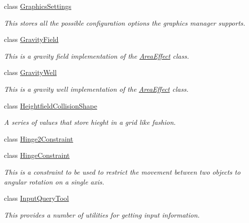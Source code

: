 \begin{DoxyCompactItemize}
class \hyperlink{structMezzanine_1_1GraphicsSettings}{GraphicsSettings}
\begin{DoxyCompactList}\small\item\em This stores all the possible configuration options the graphics manager supports. \item\end{DoxyCompactList}\item 
class \hyperlink{classMezzanine_1_1GravityField}{GravityField}
\begin{DoxyCompactList}\small\item\em This is a gravity field implementation of the \hyperlink{classMezzanine_1_1AreaEffect}{AreaEffect} class. \item\end{DoxyCompactList}\item 
class \hyperlink{classMezzanine_1_1GravityWell}{GravityWell}
\begin{DoxyCompactList}\small\item\em This is a gravity well implementation of the \hyperlink{classMezzanine_1_1AreaEffect}{AreaEffect} class. \item\end{DoxyCompactList}\item 
class \hyperlink{classMezzanine_1_1HeightfieldCollisionShape}{HeightfieldCollisionShape}
\begin{DoxyCompactList}\small\item\em A series of values that store hieght in a grid like fashion. \item\end{DoxyCompactList}\item 
class \hyperlink{classMezzanine_1_1Hinge2Constraint}{Hinge2Constraint}
\item 
class \hyperlink{classMezzanine_1_1HingeConstraint}{HingeConstraint}
\begin{DoxyCompactList}\small\item\em This is a constraint to be used to restrict the movement between two objects to angular rotation on a single axis. \item\end{DoxyCompactList}\item 
class \hyperlink{classMezzanine_1_1InputQueryTool}{InputQueryTool}
\begin{DoxyCompactList}\small\item\em This provides a number of utilities for getting input information. \item\end{DoxyCompactList}\item 

\end{DoxyCompactItemize}
